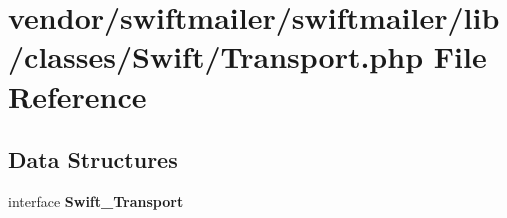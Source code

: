 \section{vendor/swiftmailer/swiftmailer/lib/classes/\+Swift/\+Transport.php File Reference}
\label{_transport_8php}
\subsection*{Data Structures}
\begin{DoxyCompactItemize}
\item 
interface {\bf Swift\+\_\+\+Transport}
\end{DoxyCompactItemize}
